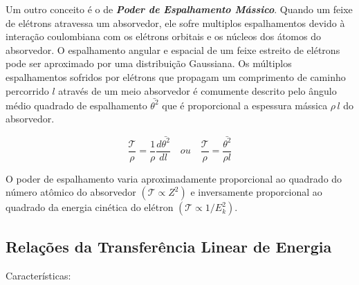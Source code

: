 \documentclass[11pt,a4paper]{article}
\begin{document}
    Um outro conceito é o de \textbf{\textit{\textcolor{CarnationPink}{Poder de Espalhamento Mássico}}}. Quando um feixe de elétrons atravessa um absorvedor, ele sofre multiplos espalhamentos devido à interação coulombiana com os elétrons orbitais e os núcleos dos átomos do absorvedor. O espalhamento angular e espacial de um feixe estreito de elétrons pode ser aproximado por uma distribuição Gaussiana. Os múltiplos espalhamentos sofridos por elétrons que propagam um comprimento de caminho percorrido $l$ através de um meio absorvedor é comumente descrito pelo ângulo médio quadrado de espalhamento $\bar{\theta^2}$ que é proporcional a espessura mássica $\rho\,l$ do absorvedor.

                \begin{equation}
                    \frac{\mathcal{T} }{\rho} = \frac{1}{\rho} \frac{d \bar{\theta^2}}{d l}
                    \quad
                    ou
                    \quad
                    \frac{\mathcal{T} }{\rho} = \frac{\bar{\theta^2}}{\rho l}
                \end{equation}

    O poder de espalhamento varia aproximadamente proporcional ao quadrado do número atômico do absorvedor $(\mathcal{T} \propto Z^2)$ e inversamente proporcional ao quadrado da energia cinética do elétron $(\mathcal{T} \propto 1/E_k^2)$.

\subsection*{Relações da Transferência Linear de Energia}
	
	Características:
\end{document}
